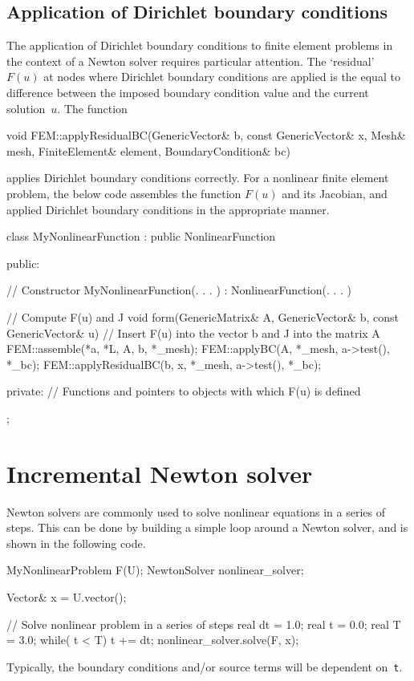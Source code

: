 \subsection{Application of Dirichlet boundary conditions}
%
The application of Dirichlet boundary conditions to finite element
problems in the context of a Newton solver requires particular 
attention. The `residual' $F(u)$ at nodes where Dirichlet boundary
conditions are applied is the equal to difference between the 
imposed boundary condition value and the current solution~$u$.
The function 
\begin{code}
void FEM::applyResidualBC(GenericVector& b, 
           const GenericVector& x, Mesh& mesh,
           FiniteElement& element, BoundaryCondition& bc)
\end{code}
applies Dirichlet boundary conditions correctly. For a nonlinear
finite element problem, the below code assembles the function $F(u)$
and its Jacobian, and applied Dirichlet boundary conditions in the
appropriate manner.
%
\small
\begin{code}
class MyNonlinearFunction : public NonlinearFunction
{
public: 
  
  // Constructor 
  MyNonlinearFunction(. . . ) : NonlinearFunction(. . . ) {}
  
  // Compute F(u) and J 
  void form(GenericMatrix& A, GenericVector& b, 
            const GenericVector& u)
  {
    // Insert F(u) into the vector b and J into the matrix A 
    FEM::assemble(*a, *L, A, b, *_mesh);
    FEM::applyBC(A, *_mesh, a->test(), *_bc);
    FEM::applyResidualBC(b, x, *_mesh, a->test(), *_bc);
  }

private:
  // Functions and pointers to objects with which F(u) is defined
};
\end{code}
\normalsize

\section{Incremental Newton solver}
%
Newton solvers are commonly used to solve nonlinear equations in a series 
of steps. This can be done by building a simple loop around a Newton solver,
and is shown in the following code.
%
\begin{code}
MyNonlinearProblem F(U);
NewtonSolver nonlinear_solver;

Vector& x = U.vector();

// Solve nonlinear problem in a series of steps
real dt = 1.0; real t  = 0.0; real T  = 3.0;
while( t < T)
{
  t += dt;
  nonlinear_solver.solve(F, x);
}
\end{code}
%
Typically, the boundary conditions and/or source terms will be dependent 
on~\texttt{t}.
